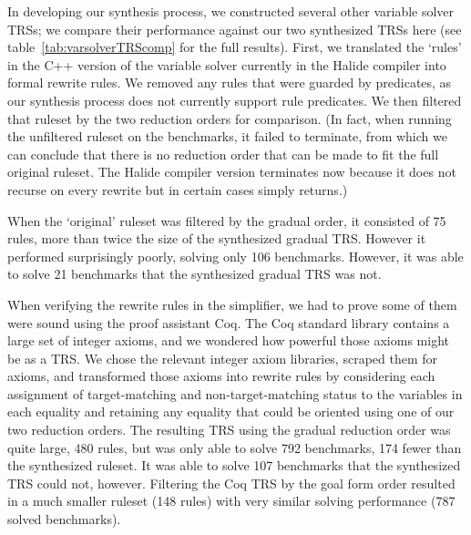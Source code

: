 In developing our synthesis process, we constructed several other variable solver TRSs; we compare their performance against our two synthesized TRSs here
 (see table~\ref{tab:varsolverTRScomp} for the full results). First, we translated the `rules' in the C++ version of the variable solver currently in the Halide compiler into formal rewrite rules. We removed any rules that were guarded by predicates, as our synthesis process does not currently support rule predicates. We then filtered that ruleset by the two reduction orders for comparison. (In fact, when running the unfiltered ruleset on the benchmarks, it failed to terminate, from which we can conclude that there is no reduction order that can be made to fit the full original ruleset. The Halide compiler version terminates now because it does not recurse on every rewrite but in certain cases simply returns.)

When the `original' ruleset was filtered by the gradual order, it consisted of 75 rules, more than twice the size of the synthesized gradual TRS. However it performed surprisingly poorly, solving only 106 benchmarks. However, it was able to solve 21 benchmarks that the synthesized gradual TRS was not.

When verifying the rewrite rules in the simplifier, we had to prove some of them were sound using the proof assistant Coq. The Coq standard library contains a large set of integer axioms, and we wondered how powerful those axioms might be as a TRS. We chose the relevant integer axiom libraries, scraped them for axioms, and transformed those axioms into rewrite rules by considering each assignment of target-matching and non-target-matching status to the variables in each equality and retaining any equality that could be oriented using one of our two reduction orders. The resulting TRS using the gradual reduction order was quite large, 480 rules, but was only able to solve 792 benchmarks, 174 fewer than the synthesized ruleset. It was able to solve 107 benchmarks that the synthesized TRS could not, however. Filtering the Coq TRS by the goal form order resulted in a much smaller ruleset (148 rules) with very similar solving performance (787 solved benchmarks). 

